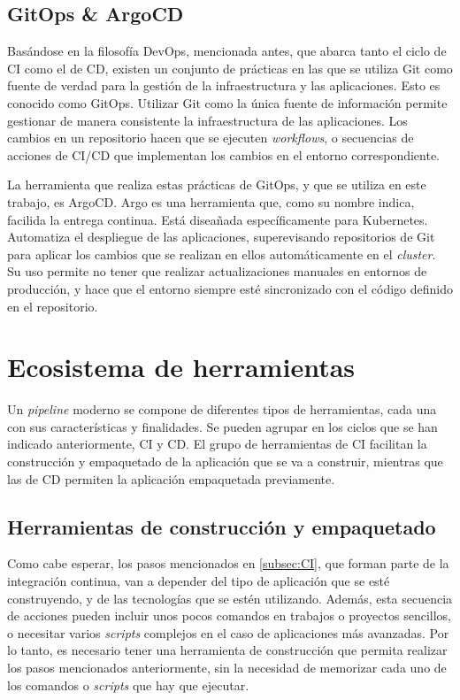 \subsection*{GitOps \& ArgoCD}

Basándose en la filosofía DevOps, mencionada antes, que abarca tanto el ciclo de CI como el de CD, existen un conjunto de prácticas en las que se utiliza Git como fuente de verdad para la gestión de la infraestructura y las aplicaciones. Esto es conocido como GitOps\cite{gitops}. Utilizar Git como la única fuente de información permite gestionar de manera consistente la infraestructura de las aplicaciones. Los cambios en un repositorio hacen que se ejecuten \textit{workflows}, o secuencias de acciones de CI/CD que implementan los cambios en el entorno correspondiente.

La herramienta que realiza estas prácticas de GitOps, y que se utiliza en este trabajo, es ArgoCD\cite{argocd}. Argo es una herramienta que, como su nombre indica, facilida la entrega continua. Está diseañada específicamente para Kubernetes. Automatiza el despliegue de las aplicaciones, superevisando repositorios de Git para aplicar los cambios que se realizan en ellos automáticamente en el \textit{cluster}. Su uso permite no tener que realizar actualizaciones manuales en entornos de producción, y hace que el entorno siempre esté sincronizado con el código definido en el repositorio.

\section{Ecosistema de herramientas}

Un \textit{pipeline} moderno se compone de diferentes tipos de herramientas, cada una con sus características y finalidades. Se pueden agrupar en los ciclos que se han indicado anteriormente, CI y CD. El grupo de herramientas de CI facilitan la construcción y empaquetado de la aplicación que se va a construir, mientras que las de CD permiten la aplicación empaquetada previamente.

\subsection*{Herramientas de construcción y empaquetado}

Como cabe esperar, los pasos mencionados en \ref{subsec:CI}, que forman parte de la integración continua, van a depender del tipo de aplicación que se esté construyendo, y de las tecnologías que se estén utilizando. Además, esta secuencia de acciones pueden incluir unos pocos comandos en trabajos o proyectos sencillos, o necesitar varios \textit{scripts} complejos en el caso de aplicaciones más avanzadas. Por lo tanto, es necesario tener una herramienta de construcción que permita realizar los pasos mencionados anteriormente, sin la necesidad de memorizar cada uno de los comandos o \textit{scripts} que hay que ejecutar.

